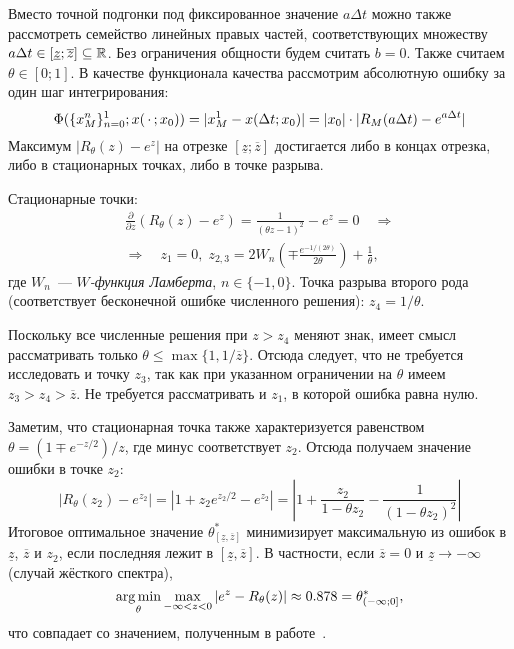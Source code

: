 Вместо точной подгонки под фиксированное значение $ a \Delta t $
можно также рассмотреть семейство линейных правых частей,
соответствующих множеству $ a \Delta t \in [\underline{z}; \overline{z}] \subseteq \mathbb{R} $.
Без ограничения общности будем считать $ b = 0 $.
Также считаем $ \theta \in [0;1] $.
В качестве функционала качества рассмотрим абсолютную ошибку за один шаг интегрирования:
\[
    \Phi(\{ x_M^n \}_{n=0}^1; x(\,\cdot\,; x_0)) = |x^1_M - x(\Delta t; x_0)| = |x_0| \cdot |R_M(a \Delta t) - e^{a \Delta t}|
\]
Максимум $ |R_\theta(z) - e^z| $ на отрезке $ [\underline{z}; \overline{z}] $ достигается либо в концах отрезка,
либо в стационарных точках, либо в точке разрыва.

Стационарные точки:
\begin{multline*}
    \frac{\partial}{\partial z} (R_\theta(z) - e^z) = \frac{1}{(\theta z - 1)^2} - e^z = 0 \quad \Longrightarrow \\
    \Longrightarrow \quad z_1 = 0, \;
    z_{2,3} = 2 W_n \left( \mp \frac{e^{-1 / (2 \theta)}}{2 \theta} \right) + \frac{1}{\theta},
\end{multline*}
где $ W_n $~--- \emph{$ W $-функция Ламберта}, $ n \in \{ -1, 0 \} $.
Точка разрыва второго рода (соответствует бесконечной ошибке численного решения): $ z_4 = 1/\theta $.

Поскольку все численные решения при $ z > z_4 $ меняют знак,
имеет смысл рассматривать только $ \theta \leqslant \max \{ 1, 1/\overline{z} \} $.
Отсюда следует, что не требуется исследовать и точку $ z_3 $,
так как при указанном ограничении на $ \theta $ имеем $ z_3 > z_4 > \overline{z} $.
Не требуется рассматривать и $ z_1 $, в которой ошибка равна нулю.

Заметим, что стационарная точка также характеризуется равенством
$ \theta = (1 \mp e^{-z/2}) / z $, где минус соответствует $ z_2 $.
Отсюда получаем значение ошибки в точке $ z_2 $:
\[
    |R_\theta(z_2) - e^{z_2}| = |1 + z_2 e^{z_2/2} - e^{z_2}| = \left|1 + \frac{z_2}{1 - \theta z_2} - \frac{1}{(1 - \theta z_2)^2} \right|
\]
Итоговое оптимальное значение $ \theta^*_{[\underline{z}, \overline{z}]} $
минимизирует максимальную из ошибок в $ \underline{z} $, $ \overline{z} $ и
$ z_2 $, если последняя лежит в $ [\underline{z}, \overline{z}] $.
В частности, если $ \overline{z} = 0 $ и $ \underline{z} \to -\infty $ (случай жёсткого спектра),
\[
    \operatorname*{\arg\min}_\theta \max_{- \infty < z < 0} | e^z - R_\theta(z) | \approx 0.878 = \theta^*_{(-\infty; 0]},
\]
что совпадает со значением, полученным в работе~\cite{liniger1969global_accuracy}.

